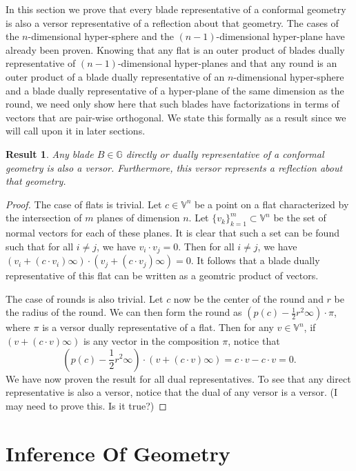 \documentclass[12pt]{article}
\newcommand{\G}{\mathbb{G}}
\newcommand{\V}{\mathbb{V}}
\newcommand{\nvai}{\infty}
\newtheorem{result}{Result}[section]
\begin{document}
In this section we prove that every blade representative of a conformal geometry
is also a versor representative of a reflection about that geometry.  The cases
of the $n$-dimensional hyper-sphere and the $(n-1)$-dimensional hyper-plane
have already been proven.  Knowing that any flat is an outer product
of blades dually representative of $(n-1)$-dimensional hyper-planes and
that any round is an outer product of a blade dually representative of an $n$-dimensional
hyper-sphere and a blade dually representative of a hyper-plane of the same
dimension as the round, we need only show here that such blades have factorizations
in terms of vectors that are pair-wise orthogonal.  We state this formally as a
result since we will call upon it in later sections.
\begin{result}\label{rslt_reflections_are_geometry}
Any blade $B\in\G$ directly or dually representative of a conformal geometry
is also a versor.  Furthermore, this versor represents a reflection about that geometry.
\end{result}
\begin{proof}
The case of flats is trivial.  Let $c\in\V^n$ be a point on a flat
characterized by the intersection of $m$ planes of dimension $n$.
Let $\{v_k\}_{k=1}^m\subset\V^n$ be the set of normal vectors for each of these planes.
It is clear that such a set can be found such that for all $i\neq j$, we have
$v_i\cdot v_j=0$.  Then for all $i\neq j$, we have $(v_i+(c\cdot v_i)\nvai)\cdot(v_j+(c\cdot v_j)\nvai)=0$.
It follows that a blade dually representative of this flat can be written
as a geomtric product of vectors.

The case of rounds is also trivial.  Let $c$ now be the center of the round
and $r$ be the radius of the round.  We can then form the round
as $(p(c)-\frac{1}{2}r^2\nvai)\cdot\pi$, where $\pi$ is a versor dually
representative of a flat.  Then for any $v\in\V^n$, if $(v+(c\cdot v)\nvai)$ is any vector
in the composition $\pi$, notice that
\begin{equation*}
\left(p(c)-\frac{1}{2}r^2\nvai\right)\cdot(v+(c\cdot v)\nvai)=c\cdot v-c\cdot v = 0.
\end{equation*}
We have now proven the result for all dual representatives.  To see that any direct
representative is also a versor, notice that the dual of any versor is a versor.  (I may
need to prove this.  Is it true?)
\end{proof}

\section{Inference Of Geometry}
\end{document}
